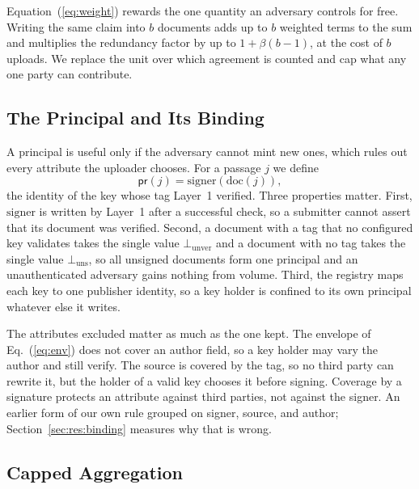 \documentclass[lettersize,journal]{IEEEtran}
\newcommand{\prin}{\mathsf{pr}}
\begin{document}
Equation~(\ref{eq:weight}) rewards the one quantity an adversary controls for free. Writing
the same claim into $b$ documents adds up to $b$ weighted terms to the sum and multiplies the
redundancy factor by up to $1 + \beta(b-1)$, at the cost of $b$ uploads. We replace the unit
over which agreement is counted and cap what any one party can contribute.

\subsection{The Principal and Its Binding}

A principal is useful only if the adversary cannot mint new ones, which rules out every
attribute the uploader chooses. For a passage $j$ we define
\begin{equation}
\prin(j) = \mathrm{signer}(\mathrm{doc}(j)),
\label{eq:indkey}
\end{equation}
the identity of the key whose tag Layer~1 verified. Three properties matter. First,
$\mathrm{signer}$ is written by Layer~1 after a successful check, so a submitter cannot assert
that its document was verified. Second, a document with a tag that no configured key validates
takes the single value $\bot_{\mathrm{unver}}$ and a document with no tag takes the single
value $\bot_{\mathrm{uns}}$, so all unsigned documents form one principal and an
unauthenticated adversary gains nothing from volume. Third, the registry maps each key to one
publisher identity, so a key holder is confined to its own principal whatever else it writes.

The attributes excluded matter as much as the one kept. The envelope of Eq.~(\ref{eq:env})
does not cover an author field, so a key holder may vary the author and still verify. The
source is covered by the tag, so no third party can rewrite it, but the holder of a valid key
chooses it before signing. Coverage by a signature protects an attribute against third
parties, not against the signer. An earlier form of our own rule grouped on signer, source,
and author; Section~\ref{sec:res:binding} measures why that is wrong.

\subsection{Capped Aggregation}
\end{document}
